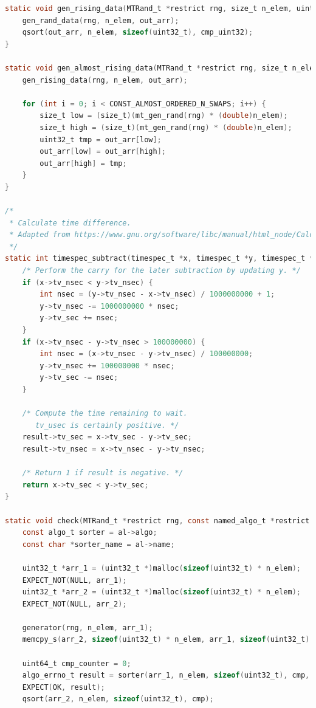 \documentclass[12pt]{article}
\begin{document}
\begin{lstlisting}[language=C]
static void gen_rising_data(MTRand_t *restrict rng, size_t n_elem, uint32_t *restrict out_arr) {
    gen_rand_data(rng, n_elem, out_arr);
    qsort(out_arr, n_elem, sizeof(uint32_t), cmp_uint32);
}

static void gen_almost_rising_data(MTRand_t *restrict rng, size_t n_elem, uint32_t *restrict out_arr) {
    gen_rising_data(rng, n_elem, out_arr);

    for (int i = 0; i < CONST_ALMOST_ORDERED_N_SWAPS; i++) {
        size_t low = (size_t)(mt_gen_rand(rng) * (double)n_elem);
        size_t high = (size_t)(mt_gen_rand(rng) * (double)n_elem);
        uint32_t tmp = out_arr[low];
        out_arr[low] = out_arr[high];
        out_arr[high] = tmp;
    }
}

/*
 * Calculate time difference.
 * Adapted from https://www.gnu.org/software/libc/manual/html_node/Calculating-Elapsed-Time.html.
 */
static int timespec_subtract(timespec_t *x, timespec_t *y, timespec_t *result) {
    /* Perform the carry for the later subtraction by updating y. */
    if (x->tv_nsec < y->tv_nsec) {
        int nsec = (y->tv_nsec - x->tv_nsec) / 1000000000 + 1;
        y->tv_nsec -= 1000000000 * nsec;
        y->tv_sec += nsec;
    }
    if (x->tv_nsec - y->tv_nsec > 100000000) {
        int nsec = (x->tv_nsec - y->tv_nsec) / 100000000;
        y->tv_nsec += 100000000 * nsec;
        y->tv_sec -= nsec;
    }

    /* Compute the time remaining to wait.
       tv_usec is certainly positive. */
    result->tv_sec = x->tv_sec - y->tv_sec;
    result->tv_nsec = x->tv_nsec - y->tv_nsec;

    /* Return 1 if result is negative. */
    return x->tv_sec < y->tv_sec;
}

static void check(MTRand_t *restrict rng, const named_algo_t *restrict al, size_t n_elem, comp_t cmp, uint64_t threshold, gen_data_t generator) {
    const algo_t sorter = al->algo;
    const char *sorter_name = al->name;

    uint32_t *arr_1 = (uint32_t *)malloc(sizeof(uint32_t) * n_elem);
    EXPECT_NOT(NULL, arr_1);
    uint32_t *arr_2 = (uint32_t *)malloc(sizeof(uint32_t) * n_elem);
    EXPECT_NOT(NULL, arr_2);

    generator(rng, n_elem, arr_1);
    memcpy_s(arr_2, sizeof(uint32_t) * n_elem, arr_1, sizeof(uint32_t) * n_elem);

    uint64_t cmp_counter = 0;
    algo_errno_t result = sorter(arr_1, n_elem, sizeof(uint32_t), cmp, threshold, &cmp_counter);
    EXPECT(OK, result);
    qsort(arr_2, n_elem, sizeof(uint32_t), cmp);


\end{lstlisting}
\end{document}

